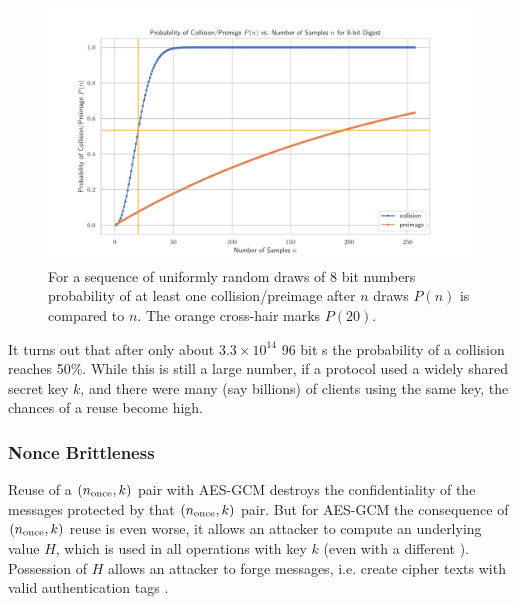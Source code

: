 \begin{figure}[ht]
\centering
\includegraphics[width=\linewidth]{figure/birthday-paradox.pdf}
\captionsetup{width=.8\linewidth} 
\caption[Birthday Paradox with 8 Bits]{For a sequence of uniformly random draws of 8 bit numbers probability of at least one collision/preimage after $n$ draws $P(n)$ is compared to $n$. The orange cross-hair marks $P(20)$.}
\label{fig:birthday-paradox-8bits}
\end{figure}

It turns out that after only about $3.3\times10^{14}$ 96 bit \nonce s the probability of a collision reaches 50\%. While this is still a large number, if a protocol used a widely shared secret key $k$, and there were many (say billions) of clients using the same key, the chances of a \nonce reuse become high.


\subsubsection{Nonce Brittleness}
\label{sec:nonce-brittleness}

Reuse of a $(\nonce,k)$ pair with AES-GCM destroys the confidentiality of the messages protected by that $(\nonce, k)$ pair. But for AES-GCM the consequence of $(\nonce,k)$ reuse is even worse, it allows an attacker to compute an underlying value $H$, which is used in all operations with key $k$ (even with a different \nonce). Possession of $H$ allows an attacker to forge messages, i.e. create cipher texts with valid authentication tags \cite[Section 5]{aesgcm-security}.

